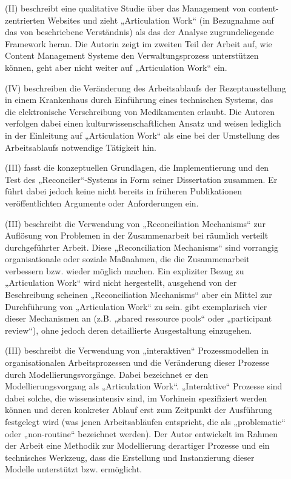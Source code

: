 \begin{description}
	\item[\citet{Eschenfelder03}] (II) beschreibt eine qualitative Studie über das Management von content-zentrierten Websites und zieht „Articulation Work“ (in Bezugnahme auf das von \citet{Corbin93} beschriebene Verständnis) als das der Analyse zugrundeliegende Framework heran. Die Autorin zeigt im zweiten Teil der Arbeit auf, wie Content Management Systeme den Verwaltungsprozess unterstützen können, geht aber nicht weiter auf „Articulation Work“ ein.
	\item[\citet{Olesen03}] (IV) beschreiben die Veränderung des Arbeitsablaufs der Rezeptausstellung in einem Krankenhaus durch Einführung eines technischen Systems, das die elektronische Verschreibung von Medikamenten erlaubt. Die Autoren verfolgen dabei einen kulturwissenschaftlichen Ansatz und weisen lediglich in der Einleitung auf „Articulation Work“ als eine bei der Umstellung des Arbeitsablaufs notwendige Tätigkeit hin.
	\item[\citet{Sarini03}] (III) fasst die konzeptuellen Grundlagen, die Implementierung und den Test des „Reconciler“-Systems in Form seiner Dissertation zusammen. Er führt dabei jedoch keine nicht bereits in früheren Publikationen veröffentlichten Argumente oder Anforderungen ein.
	\item[\citet{Gerson04}] (III) beschreibt die Verwendung von „Reconciliation Mechanisms“ zur Auflösung von Problemen in der Zusammenarbeit bei räumlich verteilt durchgeführter Arbeit. Diese „Reconciliation Mechanisms“ sind vorrangig organisationale oder soziale Maßnahmen, die die Zusammenarbeit verbessern bzw. wieder möglich machen. Ein expliziter Bezug zu „Articulation Work“ wird nicht hergestellt, ausgehend von der Beschreibung scheinen „Reconciliation Mechanisms“ aber ein Mittel zur Durchführung von „Articulation Work“ zu sein. \citeauthor{Gerson04} gibt exemplarisch vier dieser Mechanismen an (z.B. „shared ressource pools“ oder „participant review“), ohne jedoch deren detaillierte Ausgestaltung einzugehen.
	\item[\citet{Jorgensen04}] (III) beschreibt die Verwendung von „interaktiven“ Prozessmodellen in organisationalen Arbeitsprozessen und die Veränderung dieser Prozesse durch Modellierungsvorgänge. Dabei bezeichnet er den Modellierungsvorgang als „Articulation Work“. „Interaktive“ Prozesse sind dabei solche, die wissensintensiv sind, im Vorhinein spezifiziert werden können und deren konkreter Ablauf erst zum Zeitpunkt der Ausführung festgelegt wird (was jenen Arbeitsabläufen entspricht, die als „problematic“ oder „non-routine“ bezeichnet werden). Der Autor entwickelt im Rahmen der Arbeit eine Methodik zur Modellierung derartiger Prozesse und ein technisches Werkzeug, dass die Erstellung und Instanzierung dieser Modelle unterstützt bzw. ermöglicht.

\end{description}
